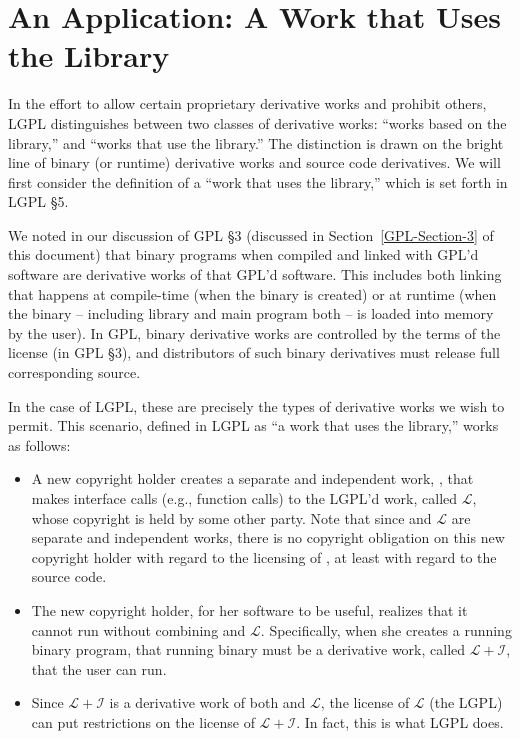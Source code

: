 \section{An Application: A Work that Uses the Library}

In the effort to allow certain proprietary derivative works and prohibit
others, LGPL distinguishes between two classes of derivative works:
``works based on the library,'' and ``works that use the library.''  The
distinction is drawn on the bright line of binary (or runtime) derivative
works and source code derivatives. We will first consider the definition
of a ``work that uses the library,'' which is set forth in LGPL \S 5.

We noted in our discussion of GPL \S 3 (discussed in
Section~\ref{GPL-Section-3} of this document) that binary programs when
compiled and linked with GPL'd software are derivative works of that GPL'd
software. This includes both linking that happens at compile-time (when
the binary is created) or at runtime (when the binary -- including library
and main program both -- is loaded into memory by the user). In GPL,
binary derivative works are controlled by the terms of the license (in GPL
\S 3), and distributors of such binary derivatives must release full
corresponding source\@.

In the case of LGPL, these are precisely the types of derivative works
we wish to permit. This scenario, defined in LGPL as ``a work that uses
the library,'' works as follows:

\newcommand{\workl}{$\mathcal{L}$}
\newcommand{\lplusi}{$\mathcal{L\!\!+\!\!I}$}

\begin{itemize}

\item A new copyright holder creates a separate and independent work,
  \worki{}, that makes interface calls (e.g., function calls) to the
  LGPL'd work, called \workl{}, whose copyright is held by some other
  party. Note that since \worki{} and \workl{} are separate and
  independent works, there is no copyright obligation on this new copyright
  holder with regard to the licensing of \worki{}, at least with regard to
  the source code.

\item The new copyright holder, for her software to be useful, realizes
  that it cannot run without combining \worki{} and \workl{}.
  Specifically, when she creates a running binary program, that running
  binary must be a derivative work, called \lplusi{}, that the user can
  run.

\item Since \lplusi{} is a derivative work of both \worki{} and \workl{},
  the license of \workl{} (the LGPL) can put restrictions on the license
  of \lplusi{}. In fact, this is what LGPL does.

\end{itemize}

